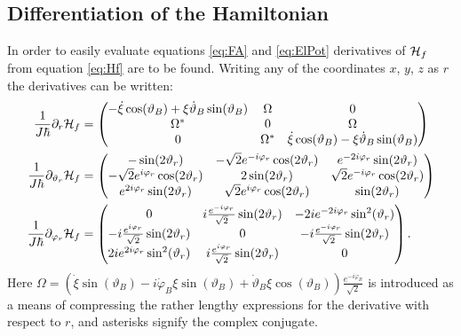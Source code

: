 \documentclass[a4paper]{article}
\begin{document}
\subsection{Differentiation of the Hamiltonian}\label{sec:Hdiff}
In order to easily evaluate equations \ref{eq:FA} and \ref{eq:ElPot} derivatives of
\(\mathbb{\cal H}_f\) from equation \ref{eq:Hf} are to be found. Writing any of the coordinates \(x\), \(y\), \(z\)
as \(r\) the derivatives can
be written:
\begin{align}
        \frac{1}{J\hbar{}}  \partial_r\mathbb{\cal H}_f  &= \pmqty{
 -\dot \xi \cos(\vartheta_B) + \xi \dot \vartheta_B \sin(\vartheta_B) & \Omega & 0 \\
 \Omega^{*} & 0 & \Omega\\
 0 & \Omega^{*}& \dot \xi \cos(\vartheta_B)- \xi \dot \vartheta_B
\sin(\vartheta_B)
        }\\
        \frac{1}{J\hbar{}}\partial_{\vartheta_r} \mathbb{\cal H}_f &= \pmqty{
                -\sin(2\vartheta_r) & -\sqrt{2} e^{-i\varphi_r}\cos(2\vartheta_r) &
                e^{-2i\varphi_r}\sin(2\vartheta_r)\\
                -\sqrt{2} e^{i\varphi_r}\cos(2\vartheta_r) & 2\sin(2\vartheta_r) &
                \sqrt{2}e^{-i\varphi_r}\cos(2\vartheta_r)\\
                e^{2i\varphi_r}\sin(2\vartheta_r) & \sqrt{2}
                e^{i\varphi_r}\cos(2\vartheta_r) & \sin(2\vartheta_r)
        }\\
        \frac{1}{J\hbar{}}\partial_{\varphi_r} \mathbb{\cal H}_f &= \pmqty{
                0 & i \frac{e^{-i\varphi_r}}{\sqrt{2} }\sin(2\vartheta_r) &
                -2ie^{-2i\varphi_r}\sin[2](\vartheta_r)\\
                -i \frac{e^{i\varphi_r}}{\sqrt{2} }\sin(2\vartheta_r) & 0 & -i
                \frac{e^{-i\varphi_r}}{\sqrt{2} }\sin(2\vartheta_r) \\
                2ie^{2i\varphi_r}\sin[2](\vartheta_r) & i \frac{e^{i\varphi_r}}{\sqrt{2}
                }\sin(2\vartheta_r) & 0
        }
.\end{align}
Here \(\Omega = (\dot \xi \sin(\vartheta_B) - i\dot \varphi_B \xi  \sin(\vartheta_B) + \dot
\vartheta_B \xi
\cos(\vartheta_B)) \frac{e^{-i\varphi_B}}{\sqrt{2} }\) is introduced as a means of compressing the
rather lengthy expressions for the derivative with respect to \(r\), and asterisks signify
the complex conjugate.
\end{document}
